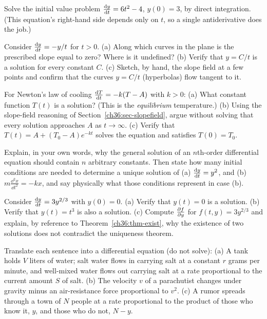 \begin{exercise}
\label{ch36:ex-integrate1}
Solve the initial value problem $\frac{\mathrm{d} y}{\mathrm{d} t} = 6t^2 - 4$, $y(0) = 3$, by direct integration. (This equation's right-hand side depends only on $t$, so a single antiderivative does the job.)
\end{exercise}

\begin{exercise}
\label{ch36:ex-slopefield1}
Consider $\frac{\mathrm{d} y}{\mathrm{d} t} = -y/t$ for $t > 0$.
(a) Along which curves in the plane is the prescribed slope equal to zero? Where is it undefined?
(b) Verify that $y = C/t$ is a solution for every constant $C$.
(c) Sketch, by hand, the slope field at a few points and confirm that the curves $y = C/t$ (hyperbolas) flow tangent to it.
\end{exercise}

\begin{exercise}
\label{ch36:ex-attractor1}
For Newton's law of cooling $\frac{\mathrm{d} T}{\mathrm{d} t} = -k(T - A)$ with $k>0$:
(a) What constant function $T(t)$ is a solution? (This is the \emph{equilibrium} temperature.)
(b) Using the slope-field reasoning of Section~\ref{ch36:sec-slopefield}, argue without solving that every solution approaches $A$ as $t\to\infty$.
(c) Verify that $T(t) = A + (T_0 - A)e^{-kt}$ solves the equation and satisfies $T(0) = T_0$.
\end{exercise}

\begin{exercise}
\label{ch36:ex-order1}
Explain, in your own words, why the general solution of an $n$th-order differential equation should contain $n$ arbitrary constants. Then state how many initial conditions are needed to determine a unique solution of (a) $\frac{\mathrm{d} y}{\mathrm{d} t} = y^2$, and (b) $m\frac{\dd^2 x}{\dd t^2} = -kx$, and say physically what those conditions represent in case (b).
\end{exercise}

\begin{exercise}
\label{ch36:ex-nonunique1}
Consider $\frac{\mathrm{d} y}{\mathrm{d} t} = 3y^{2/3}$ with $y(0) = 0$.
(a) Verify that $y(t) = 0$ is a solution.
(b) Verify that $y(t) = t^3$ is also a solution.
(c) Compute $\frac{\partial f}{\partial y}$ for $f(t,y) = 3y^{2/3}$ and explain, by reference to Theorem~\ref{ch36:thm-exist}, why the existence of two solutions does not contradict the uniqueness theorem.
\end{exercise}

\begin{exercise}
\label{ch36:ex-model1}
Translate each sentence into a differential equation (do not solve):
(a) A tank holds $V$ liters of water; salt water flows in carrying salt at a constant $r$ grams per minute, and well-mixed water flows out carrying salt at a rate proportional to the current amount $S$ of salt.
(b) The velocity $v$ of a parachutist changes under gravity minus an air-resistance force proportional to $v^2$.
(c) A rumor spreads through a town of $N$ people at a rate proportional to the product of those who know it, $y$, and those who do not, $N - y$.
\end{exercise}

